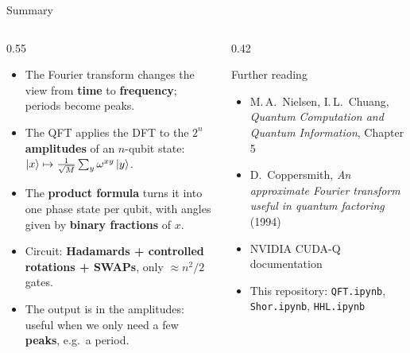 \documentclass[aspectratio=169,11pt]{beamer}
\newcommand{\key}[1]{{\color{qdark}\textbf{#1}}}
\begin{document}
\begin{frame}{Summary}
  \begin{columns}[T]
    \begin{column}{0.55\textwidth}
      \begin{itemize}
        \item The Fourier transform changes the view from \key{time} to \key{frequency}; periods become peaks.
        \item The QFT applies the DFT to the $2^n$ \key{amplitudes} of an $n$-qubit state:
          $\ket x \mapsto \tfrac{1}{\sqrt M}\sum_y \omega^{xy}\ket y$.
        \item The \key{product formula} turns it into one phase state per qubit, with angles given by
          \key{binary fractions} of $x$.
        \item Circuit: \key{Hadamards + controlled rotations + SWAPs}, only $\approx n^2/2$ gates.
        \item The output is in the amplitudes: useful when we only need a few \key{peaks}, e.g.\ a period.
      \end{itemize}
    \end{column}
    \begin{column}{0.42\textwidth}
      \begin{block}{Further reading}
        \small
        \begin{itemize}
          \item M.\,A.\ Nielsen, I.\,L.\ Chuang, \emph{Quantum Computation and Quantum Information}, Chapter 5
          \item D.\ Coppersmith, \emph{An approximate Fourier transform useful in quantum factoring} (1994)
          \item NVIDIA CUDA-Q documentation
          \item This repository: \texttt{QFT.ipynb}, \texttt{Shor.ipynb}, \texttt{HHL.ipynb}
        \end{itemize}
      \end{block}
    \end{column}
  \end{columns}
\end{frame}
\end{document}
